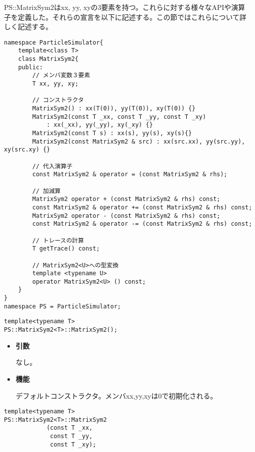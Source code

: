 PS::MatrixSym2はxx, yy, xyの3要素を持つ。これらに対する様々なAPIや演算
子を定義した。それらの宣言を以下に記述する。この節ではこれらについて詳
しく記述する。
\begin{lstlisting}[caption=MatrixSym2]
namespace ParticleSimulator{
    template<class T>
    class MatrixSym2{
    public:
        // メンバ変数３要素
        T xx, yy, xy;

        // コンストラクタ
        MatrixSym2() : xx(T(0)), yy(T(0)), xy(T(0)) {}
        MatrixSym2(const T _xx, const T _yy, const T _xy)
            : xx(_xx), yy(_yy), xy(_xy) {}
        MatrixSym2(const T s) : xx(s), yy(s), xy(s){}
        MatrixSym2(const MatrixSym2 & src) : xx(src.xx), yy(src.yy), xy(src.xy) {}

        // 代入演算子
        const MatrixSym2 & operator = (const MatrixSym2 & rhs);

        // 加減算
        MatrixSym2 operator + (const MatrixSym2 & rhs) const;
        const MatrixSym2 & operator += (const MatrixSym2 & rhs) const;
        MatrixSym2 operator - (const MatrixSym2 & rhs) const;
        const MatrixSym2 & operator -= (const MatrixSym2 & rhs) const;

        // トレースの計算
        T getTrace() const;

        // MatrixSym2<U>への型変換
        template <typename U>
        operator MatrixSym2<U> () const;
    }
}
namespace PS = ParticleSimulator;
\end{lstlisting}


\begin{screen}
\begin{verbatim}
template<typename T>
PS::MatrixSym2<T>::MatrixSym2();
\end{verbatim}
\end{screen}

\begin{itemize}

\item{{\bf 引数}}

なし。

\item{{\bf 機能}}

デフォルトコンストラクタ。メンバxx,yy,xyは0で初期化される。

\end{itemize}

\begin{screen}
\begin{verbatim}
template<typename T>
PS::MatrixSym2<T>::MatrixSym2
            (const T _xx,
             const T _yy,
             const T _xy);
\end{verbatim}
\end{screen}

